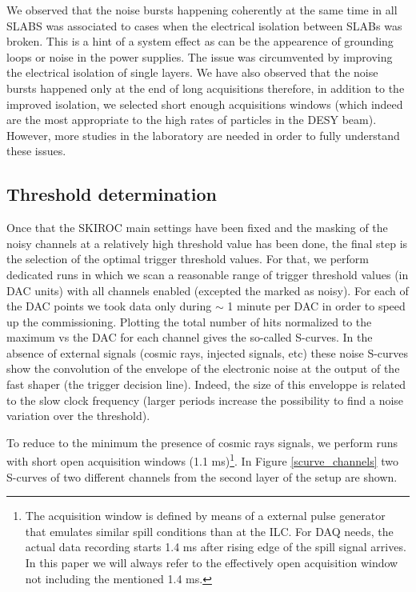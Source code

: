 \documentclass[a4paper,11pt]{article}
\begin{document}
We observed that the noise bursts happening coherently at the same time in all SLABS
was associated to cases when the electrical isolation between SLABs was broken.
This is a hint of a system effect as can be the appearence of
grounding loops or noise in the power supplies.
The issue was circumvented by improving the electrical isolation of single layers.
We have also observed that the noise bursts happened only at the end of long acquisitions therefore, in addition to the improved isolation,
we selected short enough acquisitions windows (which indeed are the most appropriate to the high rates of particles in the DESY beam).
However, more studies in the laboratory are needed in order to fully understand these issues.

\subsection{Threshold determination}
\label{sec:comm_trigger}

Once that the SKIROC main settings have been fixed and the masking of the noisy channels at a relatively high threshold value
has been done, the final step is the selection of the optimal trigger threshold values.
For that, we perform dedicated runs in which we scan a reasonable range of trigger threshold values (in DAC units)
with all channels enabled (excepted the marked as noisy). For each of the DAC points
we took data only during $\sim$ 1 minute per DAC in order to speed up the commissioning.
Plotting the total number of hits normalized to the maximum vs the DAC
for each channel gives the so-called S-curves. In the absence of external signals (cosmic rays, injected signals, etc) 
these noise S-curves show the convolution of the envelope of the 
electronic noise at the output of the fast shaper (the trigger decision line).
Indeed, the size of this enveloppe is related to the slow clock frequency
(larger periods increase the possibility to find a noise variation over the threshold).

To reduce to the minimum the
presence of cosmic rays signals, we perform runs with short open acquisition windows (1.1 ms)\footnote{The acquisition window is defined by means
  of a external pulse generator that emulates similar spill conditions than at the ILC. For DAQ needs, the actual data recording starts 1.4 ms after
rising edge of the spill signal arrives. In this paper we will always refer to the effectively open acquisition window not including the mentioned 1.4 ms.}. 
In Figure \ref{scurve_channels} 
two S-curves of two different channels from the second layer of the setup are shown.
\end{document}
